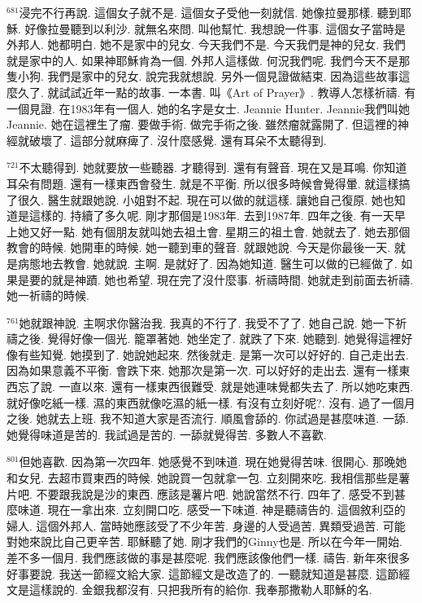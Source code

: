\documentclass{book}
\begin{document}
$^{681}$浸完不行再說.
這個女子就不是.
這個女子受他一刻就信.
她像拉曼那樣.
聽到耶穌.
好像拉曼聽到以利沙.
就無名來問.
叫他幫忙.
我想說一件事.
這個女子當時是外邦人.
她都明白.
她不是家中的兒女.
今天我們不是.
今天我們是神的兒女.
我們就是家中的人.
如果神耶穌肯為一個.
外邦人這樣做.
何況我們呢.
我們今天不是那隻小狗.
我們是家中的兒女.
說完我就想說.
另外一個見證做結束.
因為這些故事這麼久了.
就試試近年一點的故事.
一本書.
叫《Art of Prayer》.
教導人怎樣祈禱.
有一個見證.
在1983年有一個人.
她的名字是女士.
Jeannie Hunter.
Jeannie我們叫她Jeannie.
她在這裡生了瘤.
要做手術.
做完手術之後.
雖然瘤就露開了.
但這裡的神經就破壞了.
這部分就麻痺了.
沒什麼感覺.
還有耳朵不太聽得到.

$^{721}$不太聽得到.
她就要放一些聽器.
才聽得到.
還有有聲音.
現在又是耳鳴.
你知道耳朵有問題.
還有一樣東西會發生.
就是不平衡.
所以很多時候會覺得暈.
就這樣搞了很久.
醫生就跟她說.
小姐對不起.
現在可以做的就這樣.
讓她自己復原.
她也知道是這樣的.
持續了多久呢.
剛才那個是1983年.
去到1987年.
四年之後.
有一天早上她又好一點.
她有個朋友就叫她去祖土會.
星期三的祖土會.
她就去了.
她去那個教會的時候.
她開車的時候.
她一聽到車的聲音.
就跟她說.
今天是你最後一天.
就是病態地去教會.
她就說.
主啊.
是就好了.
因為她知道.
醫生可以做的已經做了.
如果是要的就是神蹟.
她也希望.
現在完了沒什麼事.
祈禱時間.
她就走到前面去祈禱.
她一祈禱的時候.

$^{761}$她就跟神說.
主啊求你醫治我.
我真的不行了.
我受不了了.
她自己說.
她一下祈禱之後.
覺得好像一個光.
籠罩著她.
她坐定了.
就跌了下來.
她聽到.
她覺得這裡好像有些知覺.
她摸到了.
她說她起來.
然後就走.
是第一次可以好好的.
自己走出去.
因為如果意義不平衡.
會跌下來.
她那次是第一次.
可以好好的走出去.
還有一樣東西忘了說.
一直以來.
還有一樣東西很難受.
就是她連味覺都失去了.
所以她吃東西.
就好像吃紙一樣.
濕的東西就像吃濕的紙一樣.
有沒有立刻好呢?.
沒有.
過了一個月之後.
她就去上班.
我不知道大家是否流行.
順風會舔的.
你試過是甚麼味道.
一舔.
她覺得味道是苦的.
我試過是苦的.
一舔就覺得苦.
多數人不喜歡.

$^{801}$但她喜歡.
因為第一次四年.
她感覺不到味道.
現在她覺得苦味.
很開心.
那晚她和女兒.
去超市買東西的時候.
她說買一包就拿一包.
立刻開來吃.
我相信那些是薯片吧.
不要跟我說是沙的東西.
應該是薯片吧.
她說當然不行.
四年了.
感受不到甚麼味道.
現在一拿出來.
立刻開口吃.
感受一下味道.
神是聽禱告的.
這個敘利亞的婦人.
這個外邦人.
當時她應該受了不少年苦.
身邊的人受過苦.
異類受過苦.
可能對她來說比自己更辛苦.
耶穌聽了她.
剛才我們的Ginny也是.
所以在今年一開始.
差不多一個月.
我們應該做的事是甚麼呢.
我們應該像他們一樣.
禱告.
新年來很多好事要說.
我送一節經文給大家.
這節經文是改造了的.
一聽就知道是甚麼.
這節經文是這樣說的.
金銀我都沒有.
只把我所有的給你.
我奉那撒勒人耶穌的名.
\end{document}
